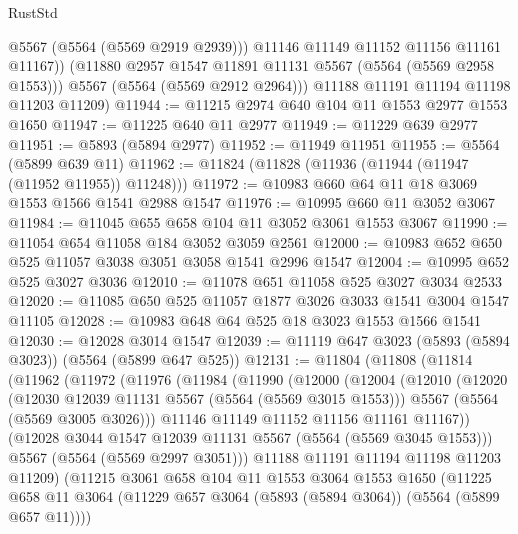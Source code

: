 \begin{lexlean}{RustStd}
\begin{coremodule}
              @5567
              (@5564 (@5569 @2919 @2939)))
            @11146
            @11149
            @11152
            @11156
            @11161
            @11167))
        (@11880 @2957 @1547 @11891 @11131 @5567 (@5564 (@5569 @2958 @1553)))
        @5567
        (@5564 (@5569 @2912 @2964)))
      @11188
      @11191
      @11194
      @11198
      @11203
      @11209)
@11944 := @11215 @2974 @640 @104 @11 @1553 @2977 @1553 @1650
@11947 := @11225 @640 @11 @2977
@11949 := @11229 @639 @2977
@11951 := @5893 (@5894 @2977)
@11952 := @11949 @11951
@11955 := @5564 (@5899 @639 @11)
@11962 := @11824 (@11828 (@11936 (@11944 (@11947 (@11952 @11955)) @11248)))
@11972 := @10983 @660 @64 @11 @18 @3069 @1553 @1566 @1541 @2988 @1547
@11976 := @10995 @660 @11 @3052 @3067
@11984 := @11045 @655 @658 @104 @11 @3052 @3061 @1553 @3067
@11990 := @11054 @654 @11058 @184 @3052 @3059 @2561
@12000 := @10983 @652 @650 @525 @11057 @3038 @3051 @3058 @1541 @2996 @1547
@12004 := @10995 @652 @525 @3027 @3036
@12010 := @11078 @651 @11058 @525 @3027 @3034 @2533
@12020 := @11085 @650 @525 @11057 @1877 @3026 @3033 @1541 @3004 @1547 @11105
@12028 := @10983 @648 @64 @525 @18 @3023 @1553 @1566 @1541
@12030 := @12028 @3014 @1547
@12039 := @11119 @647 @3023 (@5893 (@5894 @3023)) (@5564 (@5899 @647 @525))
@12131 := @11804
    (@11808
      (@11814
        (@11962
          (@11972
            (@11976
              (@11984
                (@11990
                  (@12000
                    (@12004
                      (@12010
                        (@12020
                          (@12030 @12039 @11131 @5567 (@5564 (@5569 @3015 @1553)))
                          @5567
                          (@5564 (@5569 @3005 @3026)))
                        @11146
                        @11149
                        @11152
                        @11156
                        @11161
                        @11167))
                    (@12028 @3044 @1547 @12039 @11131 @5567 (@5564 (@5569 @3045 @1553)))
                    @5567
                    (@5564 (@5569 @2997 @3051)))
                  @11188
                  @11191
                  @11194
                  @11198
                  @11203
                  @11209)
                (@11215
                  @3061
                  @658
                  @104
                  @11
                  @1553
                  @3064
                  @1553
                  @1650
                  (@11225
                    @658
                    @11
                    @3064
                    (@11229 @657 @3064 (@5893 (@5894 @3064)) (@5564 (@5899 @657 @11))))

\end{coremodule}
\end{lexlean}

